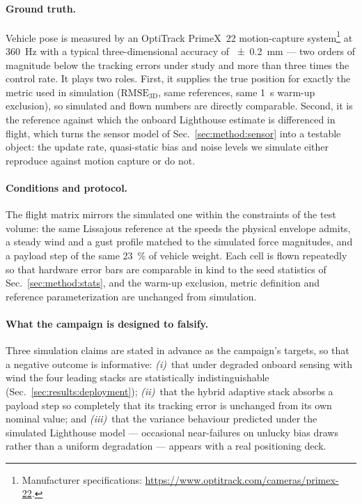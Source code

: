 \paragraph{Ground truth.}
Vehicle pose is measured by an OptiTrack PrimeX~22 motion-capture
system\footnote{Manufacturer specifications: \url{https://www.optitrack.com/cameras/primex-22}.}
at \SI{360}{\hertz} with a typical three-dimensional accuracy of
\SI{\pm0.2}{\milli\meter} --- two orders of magnitude below the tracking errors under
study and more than three times the control rate. It plays two roles. First, it supplies
the true position for exactly the metric used in simulation
($\mathrm{RMSE}_{\mathrm{3D}}$, same references, same \SI{1}{\second} warm-up
exclusion), so simulated and flown numbers are directly comparable. Second, it is the
reference against which the onboard Lighthouse estimate is differenced in flight, which
turns the sensor model of Sec.~\ref{sec:method:sensor} into a testable object: the
update rate, quasi-static bias and noise levels we simulate either reproduce against
motion capture or do not.

\paragraph{Conditions and protocol.}
The flight matrix mirrors the simulated one within the constraints of the test volume:
the same Lissajous reference at the speeds the physical envelope admits, a steady wind
and a gust profile matched to the simulated force magnitudes, and a payload step of the
same \SI{23}{\percent} of vehicle weight. Each cell is flown repeatedly so that hardware
error bars are comparable in kind to the seed statistics of
Sec.~\ref{sec:method:stats}, and the warm-up exclusion, metric definition and reference
parameterization are unchanged from simulation.

\paragraph{What the campaign is designed to falsify.}
Three simulation claims are stated in advance as the campaign's targets, so that a
negative outcome is informative: \emph{(i)}~that under degraded onboard sensing with
wind the four leading stacks are statistically indistinguishable
(Sec.~\ref{sec:results:deployment}); \emph{(ii)}~that the hybrid adaptive stack absorbs
a payload step so completely that its tracking error is unchanged from its own nominal
value; and \emph{(iii)}~that the variance behaviour predicted under the simulated
Lighthouse model --- occasional near-failures on unlucky bias draws rather than a
uniform degradation --- appears with a real positioning deck.
